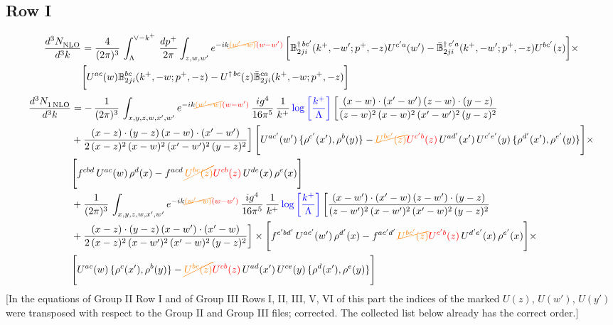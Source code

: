 \documentclass[9pt]{article}
\def\mf#1{\mathbb{#1}}
\numberwithin{equation}{section}
\begin{document}
\subsection{Row I}
\begin{align}
    \frac{d^{3}N_{\rm NLO}^{\rm}}{d^{3}k}  & = \frac{4}{(2\pi)^{3}}\,\int_{\Lambda}^{\vee-k^{+}}\, \frac{dp^{+}}{2\pi}\int_{z,w,w^{\prime}} e^{-ik{\color{orange}\cancel{(w^{\prime}-w)}}{\color{red}(w-w^{\prime})}}\, \bigg[\mf{B}^{\dagger\, bc^{\prime}}_{2ji}(k^{+},-w^{\prime};p^{+},-z)U^{ c^{\prime}a}(w^{\prime}) -\Bar{\mf{B}}^{\dagger\, c^{\prime}a}_{2ji}(k^{+},-w^{\prime}; p^{+},-z)U^{bc^{\prime}}(z)\bigg]\times\notag \\ & \bigg[U^{ac}(w) \mf{B}^{bc}_{2ji}(k^{+},-w;p^{+},-z) -U^{\dagger\, bc}(z)\Bar{\mf{B}}^{ca}_{2ji}(k^{+},-w; p^{+},-z)\bigg]\nonumber
\end{align}
\begin{align}
 \frac{d^{3}N_{1\,\rm NLO}^{\rm}}{d^{3}k}  & =   -\, \frac{1}{(2\pi)^{3}}\,\int_{x,y,z,w,x',w^{\prime}} e^{-ik{\color{orange}\cancel{(w^{\prime}-w)}}{\color{red}(w-w^{\prime})}}\,\frac{ig^{4}}{16\pi^{5}}\,\frac{1}{k^{+}}\,{\color{blue}\log{\left[\frac{k^{+}}{\Lambda}\right]}}\,\bigg[\frac{(x-w)\cdot (x'-w')\,(z-w)\cdot (y-z)}{(z-w)^{2}\,(x-w)^{2}\,(x'-w')^{2}\,(y-z)^{2}}\notag \\ & +\frac{(x-z)\cdot (y-z)\,(x-w)\cdot (x'-w')}{2\,(x-z)^{2}\, (x-w)^{2}\,(x'-w')^{2}\,(y-z)^{2}}\bigg]\, \Bigg[U^{ac'}(w')\,\{\rho^{c'}(x'),\rho^{b}(y)\}-{\color{orange}\cancel{U^{bc'}(z)}}{\color{red}U^{c'b}(z)}\,U^{ad'}(x')\,U^{c'e'}(y)\, \{\rho^{d'}(x'),\rho^{e'}(y)\}\Bigg]\times \notag \\ & \Bigg[f^{cbd}\,U^{ac}(w)\,\rho^{d}(x)-f^{acd}\, {\color{orange}\cancel{U^{bc}(z)}}{\color{red}U^{cb}(z)}\,U^{de}(x)\,\rho^{e}(x)\Bigg]\notag \\ & + \frac{1}{(2\pi)^{3}}\,\int_{x,y,z,w,x',w^{\prime}} e^{-ik{\color{orange}\cancel{(w^{\prime}-w)}}{\color{red}(w-w^{\prime})}}\,\frac{ig^{4}}{16\pi^{5}}\,\frac{1}{k^{+}}\,{\color{blue}\log{\left[\frac{k^{+}}{\Lambda}\right]}}\,\bigg[\frac{(x-w')\cdot (x'-w)\,(z-w')\cdot (y-z)}{(z-w')^{2}\,(x-w')^{2}\,(x'-w)^{2}\,(y-z)^{2}}\notag \\ & +\frac{(x-z)\cdot (y-z)\,(x-w')\cdot (x'-w)}{2\,(x-z)^{2}\, (x-w')^{2}\,(x'-w)^{2}\,(y-z)^{2}}\bigg] \times\Bigg[f^{c'bd'}\,U^{ac'}(w')\,\rho^{d'}(x)-f^{ac'd'}\, {\color{orange}\cancel{U^{bc'}(z)}}{\color{red}U^{c'b}(z)}\,U^{d'e'}(x)\,\rho^{e'}(x)\Bigg] \times \notag \\ & \Bigg[U^{ac}(w)\,\{\rho^{c}(x'),\rho^{b}(y)\}-{\color{orange}\cancel{U^{bc}(z)}}{\color{red}U^{cb}(z)}\,U^{ad}(x')\,U^{ce}(y)\, \{\rho^{d}(x'),\rho^{e}(y)\}\Bigg]
\end{align} {\color{red}[In the equations of Group II Row I and of Group III Rows I, II, III, V, VI of this part the indices of the marked $U(z)$, $U(w')$, $U(y')$ were transposed with respect to the Group II and Group III files; corrected. The collected list below already has the correct order.]}\par\noindent
\end{document}
